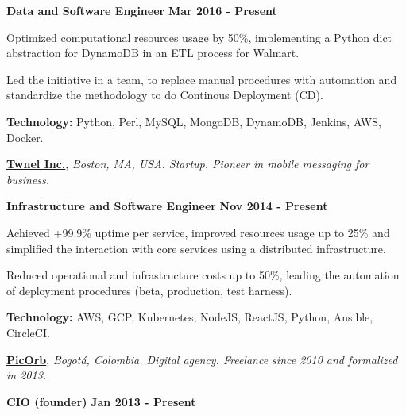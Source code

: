 \begin{outerlist}
\item[\FA \faAngleDoubleRight] \textbf{Data and Software Engineer}
\hfill
\textbf{Mar 2016 - Present}
\end{outerlist}

\begin{innerlist}
\item Optimized computational resources usage by 50\%, implementing
a Python dict abstraction for DynamoDB in an ETL process for Walmart.
\item Led the initiative in a team, to replace manual procedures with
automation and standardize the methodology to do Continous Deployment (CD).
\item \textbf{Technology:} Python, Perl, MySQL, MongoDB, DynamoDB,
Jenkins, AWS, Docker.
\end{innerlist}

\quarterblankline

\href{http://www.twnel.com/}{\textbf{Twnel Inc.}}, \textit{Boston, MA, USA.
Startup.
Pioneer in mobile messaging for business.}

\begin{outerlist}
\item[\FA \faAngleDoubleRight] \textbf{Infrastructure and Software
Engineer}
\hfill
\textbf{Nov 2014 - Present}
\end{outerlist}

\begin{innerlist}
\item Achieved +99.9\% uptime per
service, improved resources usage up to 25\% and simplified the
interaction with core services using a distributed infrastructure.
\item Reduced operational and infrastructure costs up to 50\%, leading the
automation of deployment procedures (beta, production, test harness).
\item \textbf{Technology:} AWS, GCP, Kubernetes, NodeJS,
ReactJS, Python, Ansible, CircleCI. %
\end{innerlist}

\quarterblankline

\href{http://www.picorb.com/}{\textbf{PicOrb}}, \textit{Bogot\'a, Colombia.
Digital agency. Freelance since 2010 and formalized in
2013.}

\begin{outerlist}
\item[\FA \faAngleDoubleRight] \textbf{CIO (founder)} \hfill \textbf{Jan 2013 -
Present}
\end{outerlist}

